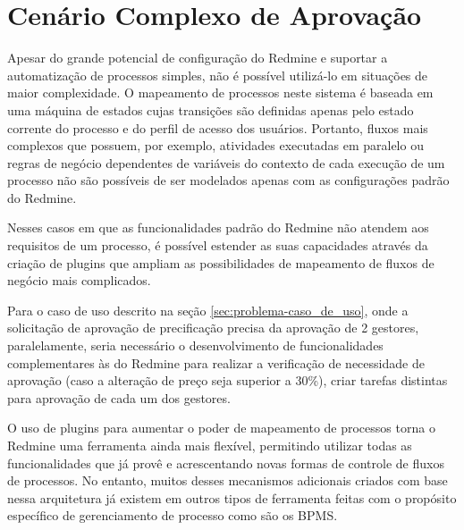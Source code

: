 \section{Cenário Complexo de Aprovação}\label{sec:cenario-complexo}

Apesar do grande potencial de configuração do Redmine e suportar a automatização de processos simples, não é possível utilizá-lo em situações de maior complexidade. O mapeamento de processos neste sistema é baseada em uma máquina de estados cujas transições são definidas apenas pelo estado corrente do processo e do perfil de acesso dos usuários. Portanto, fluxos mais complexos que possuem, por exemplo, atividades executadas em paralelo ou regras de negócio dependentes de variáveis do contexto de cada execução de um processo não são possíveis de ser modelados apenas com as configurações padrão do Redmine.

Nesses casos em que as funcionalidades padrão do Redmine não atendem aos requisitos de um processo, é possível estender as suas capacidades através da criação de plugins que ampliam as possibilidades de mapeamento de fluxos de negócio mais complicados.

Para o caso de uso descrito na seção \ref{sec:problema-caso_de_uso}, onde a solicitação de aprovação de precificação precisa da aprovação de 2 gestores, paralelamente, seria necessário o desenvolvimento de funcionalidades complementares às do Redmine para realizar a verificação de necessidade de aprovação (caso a alteração de preço seja superior a 30\%), criar tarefas distintas para aprovação de cada um dos gestores.

O uso de plugins para aumentar o poder de mapeamento de processos torna o Redmine uma ferramenta ainda mais flexível, permitindo utilizar todas as funcionalidades que já provê e acrescentando novas formas de controle de fluxos de processos. No entanto, muitos desses mecanismos adicionais criados com base nessa arquitetura já existem em outros tipos de ferramenta feitas com o propósito específico de gerenciamento de processo como são os BPMS.